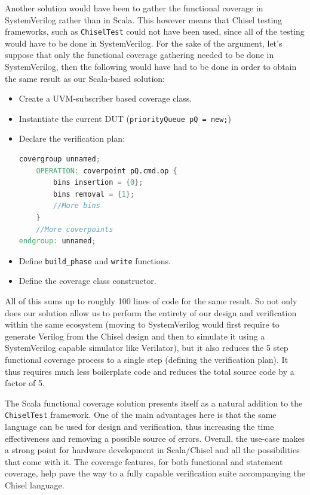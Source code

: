 \documentclass[runningheads]{llncs}
\begin{document}
Another solution would have been to gather the functional coverage in SystemVerilog rather than in Scala. This however means that Chisel testing frameworks, such as \texttt{ChiselTest} could not have been used, since all of the testing would have to be done in SystemVerilog. For the sake of the argument, let's suppose that only the functional coverage gathering needed to be done in SystemVerilog, then the following would have had to be done in order to obtain the same result as our Scala-based solution:  
\begin{itemize}
    \item Create a UVM-subscriber based coverage class.
    \item Instantiate the current DUT (\texttt{priorityQueue pQ  = new;})
    \item Declare the verification plan: 
    \begin{lstlisting}[language=verilog]
covergroup unnamed;
	OPERATION: coverpoint pQ.cmd.op {
		bins insertion = {0};
		bins removal = {1};
		//More bins
	}
	//More coverpoints
endgroup: unnamed;
    \end{lstlisting}
    \item Define \texttt{build\_phase} and \texttt{write} functions.
    \item Define the coverage class constructor.
\end{itemize}  
All of this sums up to roughly 100 lines of code for the same result. So not only does our solution allow us to perform the entirety of our design and verification within the same ecosystem (moving to SystemVerilog would first require to generate Verilog from the Chisel design and then to simulate it using a SystemVerilog capable simulator like Verilator), but it also reduces the 5 step functional coverage process to a single step (defining the verification plan). It thus requires much less boilerplate code and reduces the total source code by a factor of 5.  

The Scala functional coverage solution presents itself as a natural addition to the \texttt{ChiselTest} framework. One of the main advantages here is that the same language can be used for design and verification, thus increasing the time effectiveness and removing a possible source of errors. Overall, the use-case makes a strong point for hardware development in Scala/Chisel and all the possibilities that come with it. The coverage features, for both functional and statement coverage, help pave the way to a fully capable verification suite accompanying the Chisel language.
\end{document}
